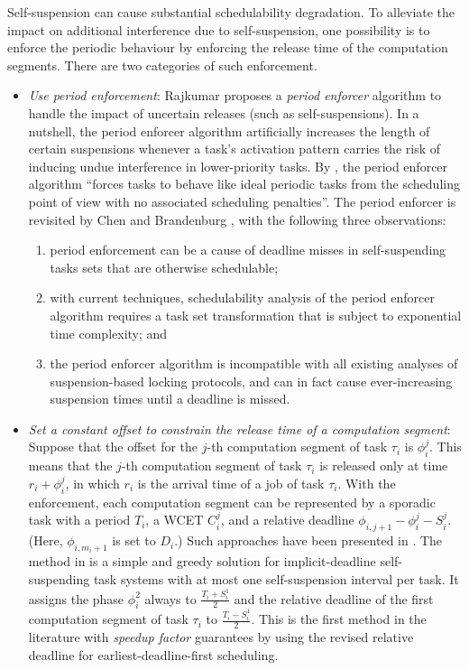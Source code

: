 \begin{table}[t]
\begin{table}[t]
Self-suspension can cause substantial schedulability degradation. To alleviate the impact on additional interference due to self-suspension, one possibility is to enforce the periodic behaviour by enforcing the release time of the computation segments. There are two categories of such enforcement. 
  \begin{itemize}
  \item {\it Use period enforcement}: Rajkumar \cite{Raj:suspension1991} proposes a \emph{period enforcer} algorithm to handle the impact of uncertain releases (such as self-suspensions). In a nutshell, the period enforcer algorithm artificially increases the length of certain suspensions whenever a task's activation pattern carries the risk of inducing undue interference in lower-priority tasks. By \cite{Raj:suspension1991}, the period enforcer algorithm ``forces tasks to behave like ideal periodic tasks from the scheduling point of view with no associated scheduling penalties''. The period enforcer is revisited by Chen and Brandenburg \cite{ChenBrandenburg}, with the following three observations:
\begin{enumerate}
	\item period enforcement can be a cause of deadline misses in self-suspending tasks sets that are otherwise schedulable;
	\item with current techniques, schedulability analysis of the period enforcer algorithm requires a task set transformation that is subject to exponential time complexity; and 	
        \item the period enforcer algorithm is incompatible with all existing analyses of suspension-based locking protocols, and can in fact cause ever-increasing suspension times until a deadline is missed.
\end{enumerate}
  \item {\it Set a constant offset to constrain the release time of a computation segment}: Suppose that the offset for the $j$-th computation segment of task $\tau_i$ is $\phi_i^j$. This means that the $j$-th computation segment of task $\tau_i$ is released only at time $r_i+\phi_i^j$, in which $r_i$ is the arrival time of a job of task $\tau_i$. With the enforcement, each computation segment can be represented by a sporadic task with a period $T_i$, a WCET $C_i^j$, and a relative deadline $\phi_{i,j+1}-\phi_i^j-S_i^j$. (Here, $\phi_{i,m_i+1}$ is set to $D_i$.) Such approaches have been presented in \cite{RTSS-KimANR13,LR:rtas10,RTSS-ChenL14}. The method in \cite{RTSS-ChenL14} is a simple and greedy solution for implicit-deadline self-suspending task systems with at most one self-suspension interval per task. It assigns the phase $\phi_i^2$ always to $\frac{T_i+S_i^1}{2}$ and the relative deadline of the first computation segment of task $\tau_i$ to $\frac{T_i-S_i^1}{2}$. This is the first method in the literature with \emph{speedup factor} guarantees by using the revised relative deadline for earliest-deadline-first scheduling. 



\end{itemize}
\end{table}
\end{table}
